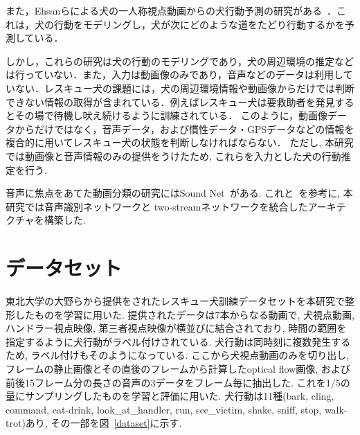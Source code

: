 \documentclass[twocolumn, a4paper]{UECIEresume}
\begin{document}
また，Ehsanらによる犬の一人称視点動画からの犬行動予測の研究がある~\cite{whoretthedog}．これは，犬の行動をモデリングし，犬が次にどのような道をたどり行動するかを予測している．

しかし，これらの研究は犬の行動のモデリングであり，犬の周辺環境の推定などは行っていない．また，入力は動画像のみであり，音声などのデータは利用していない．レスキュー犬の課題には，犬の周辺環境情報や動画像からだけでは判断できない情報の取得が含まれている．例えばレスキュー犬は要救助者を発見するとその場で待機し吠え続けるように訓練されている．
このように，動画像データからだけではなく，音声データ，および慣性データ・GPSデータなどの情報を複合的に用いてレスキュー犬の状態を判断しなければならない．
ただし, 本研究では動画像と音声情報のみの提供をうけたため, これらを入力とした犬の行動推定を行う. 


音声に焦点をあてた動画分類の研究にはSound Net~\cite{aytar2016soundnet}がある.
これと~\cite{simonyan2014two}を参考に, 本研究では音声識別ネットワークと two-streamネットワークを統合したアーキテクチャを構築した.

\section{データセット}
東北大学の大野らから提供をされたレスキュー犬訓練データセットを本研究で整形したものを学習に用いた.
提供されたデータは7本からなる動画で, 犬視点動画, ハンドラー視点映像, 第三者視点映像が横並びに結合されており, 時間の範囲を指定するように犬行動がラベル付けされている.
犬行動は同時刻に複数発生するため, ラベル付けもそのようになっている.
ここから犬視点動画のみを切り出し, フレームの静止画像とその直後のフレームから計算したoptical flow画像, および前後15フレーム分の長さの音声の3データをフレーム毎に抽出した.
これを1/5の量にサンプリングしたものを学習と評価に用いた.
犬行動は11種(bark, cling, command, eat-drink, look\_at\_handler, run, see\_victim, shake, sniff, stop, walk-trot)あり, その一部を図~\ref{dataset}に示す.
\end{document}
